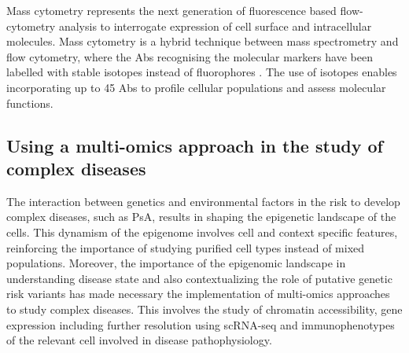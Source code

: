 Mass cytometry represents the next generation of fluorescence based flow-cytometry analysis to interrogate expression of cell surface and intracellular molecules. Mass cytometry is a hybrid technique between mass spectrometry and flow cytometry, where the Abs recognising the molecular markers have been labelled with stable isotopes instead of fluorophores \parencite{Bandura2009}. The use of isotopes enables incorporating up to 45 Abs to profile cellular populations and assess molecular functions. 



\subsection{Using a multi-omics approach in the study of complex diseases}

The interaction between genetics and environmental factors in the risk to develop complex diseases, such as PsA, results in shaping the epigenetic landscape of the cells. This dynamism of the  epigenome involves cell and context specific features, reinforcing the importance of studying purified cell types instead of mixed populations. Moreover, the importance of the epigenomic landscape in understanding disease state and also contextualizing the role of putative genetic risk variants has made necessary the implementation of multi-omics approaches to study complex diseases. This involves the study of chromatin accessibility, gene expression including further resolution using scRNA-seq and immunophenotypes of the relevant cell involved in disease pathophysiology.




